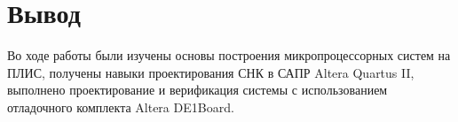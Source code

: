 \chapter{Вывод}

    Во ходе работы были изучены основы построения микропроцессорных систем на ПЛИС, получены навыки проектирования СНК в САПР Altera Quartus II, выполнено проектирование и верификация системы с использованием отладочного комплекта Altera DE1Board.